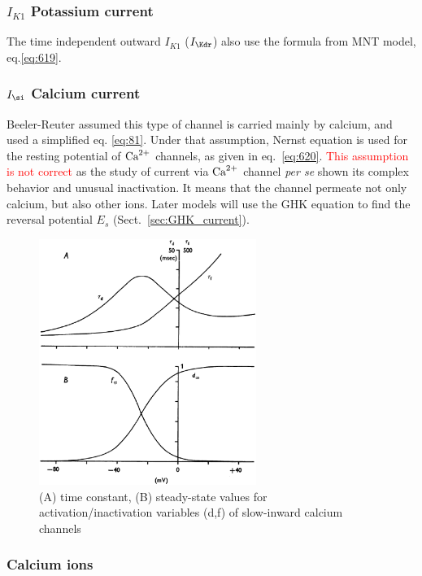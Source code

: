 \subsubsection{$I_{K1}$ Potassium current}

The time independent outward $I_{K1}$ ($I_\Kdr$) also use the formula
from MNT model, eq.\ref{eq:619}.

\subsubsection{$I_\si$ Calcium current}

Beeler-Reuter assumed this type of channel is carried mainly by calcium, and
used a simplified eq. \eqref{eq:81}. Under that assumption, Nernst equation is
used for the resting potential of ${\text{Ca}^{2+}}$ channels, as given in
eq.~\eqref{eq:620}.
\textcolor{red}{This assumption is not correct} as the study of current via
${\text{Ca}^{2+}}$ channel {\it per se} shown its complex behavior and unusual inactivation. It 
means that the channel permeate not only calcium, but also other ions. Later
models will use the GHK equation to find the reversal potential $E_s$
(Sect.~\ref{sec:GHK_current}).

\begin{figure}[hbt]
  \centerline{\includegraphics[height=8cm,
    angle=0]{./images/BR_df.eps}}
 \caption{(A) time constant, (B) steady-state values for
   activation/inactivation variables (d,f) of slow-inward calcium
   channels}
\label{fig:BR_df}
\end{figure}

\subsubsection{Calcium ions}


